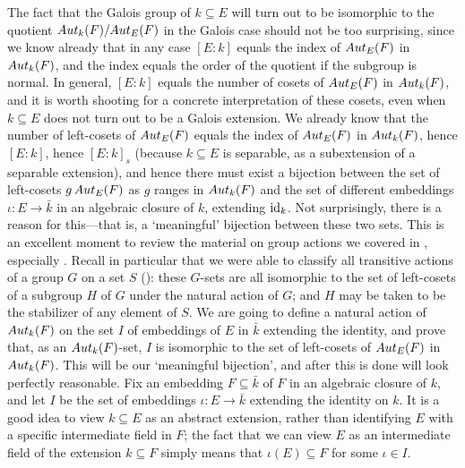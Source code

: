 The fact that the Galois group of $k \subseteq E$ will turn out to be
isomorphic to the quotient $Aut_k(F)/Aut_E(F)$ in the Galois case
should not be too surprising, since we know already that in any case
$[E : k]$ equals the index of $Aut_E(F)$ in $Aut_k(F)$, and the
index equals the order of the quotient if the subgroup is normal. In
general, $[E : k]$ equals the number of cosets of $Aut_E(F)$ in
$Aut_k(F)$, and it is worth shooting for a concrete interpretation of
these cosets, even when $k \subseteq E$ does not turn out to be a
Galois extension.  We already know that the number of left-cosets of
$Aut_E(F)$ equals the index of $Aut_E(F)$ in $Aut_k(F)$, hence
$[E : k]$, hence $[E : k]_s$ (because $k \subseteq E$ is separable, as
a subextension of a separable extension), and hence there must exist a
bijection between the set of left-cosets $g\,Aut_E(F)$ as $g$ ranges
in $Aut_k(F)$ and the set of different embeddings
$\iota : E \to \bar{k}$ in an algebraic closure of $k$, extending
$\operatorname{id}_k$. Not surprisingly, there is a reason for this---that is, a
`meaningful' bijection between these two sets.  This is an excellent
moment to review the material on group actions we covered in
, especially
. Recall
in particular that we were able to classify all transitive actions of
a group $G$ on a set $S$
(): these $G$-sets are
all isomorphic to the set of left-cosets of a subgroup $H$ of $G$
under the natural action of $G$; and $H$ may be taken to be the
stabilizer of any element of $S$.  We are going to define a natural
action of $Aut_k(F)$ on the set $I$ of embeddings of $E$ in $\bar{k}$
extending the identity, and prove that, as an $Aut_k(F)$-set, $I$ is
isomorphic to the set of left-cosets of $Aut_E(F)$ in
$Aut_k(F)$. This will be our `meaningful bijection', and after this
is done  will look perfectly reasonable.  Fix an
embedding $F \subseteq \bar{k}$ of $F$ in an algebraic closure of $k$,
and let $I$ be the set of embeddings $\iota : E \to \bar{k}$ extending
the identity on $k$. It is a good idea to view $k \subseteq E$ as an
abstract extension, rather than identifying $E$ with a specific
intermediate field in $F$; the fact that we can view $E$ as an
intermediate field of the extension $k \subseteq F$ simply means that
$\iota(E) \subseteq F$ for some $\iota \in I$.
